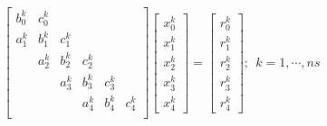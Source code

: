 \documentclass{article}
\begin{document}
\begin{equation} \left[\begin{array}{ccccc} b_0^k & c_0^k & & & \\ a_1^k & b_1^k & c_1^k & & \\ & a_2^k & b_2^k & c_2^k & & \\ & & a_3^k & b_3^k & c_3^k & \\ & & & a_4^k & b_4^k & c_4^k \\ \end{array}\right] \left[\begin{array}{c} x_0^k \\ x_1^k \\ x_2^k \\ x_3^k \\ x_4^k \end{array}\right] = \left[\begin{array}{c} r_0^k \\ r_1^k \\ r_2^k \\ r_3^k \\ r_4^k \end{array}\right]; \ \ k= 1,\cdots,ns \end{equation}
\pagebreak
\end{document}
